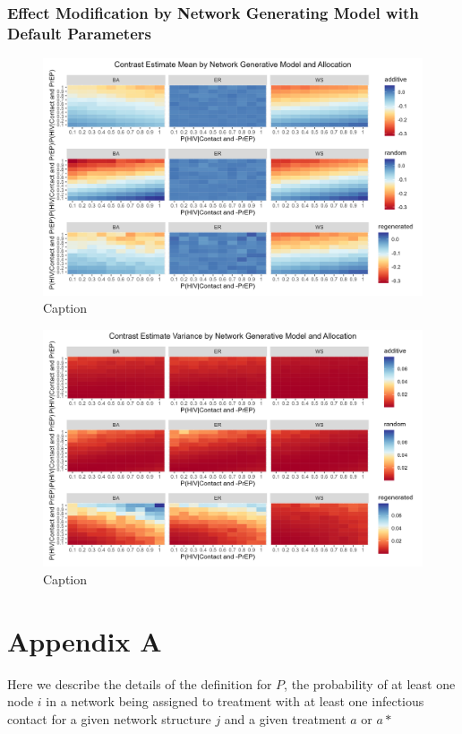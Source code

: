 \documentclass{article}
\theoremstyle{definition}
\begin{document}
\subsubsection{Effect Modification by Network Generating Model with Default Parameters}
\begin{figure}[H]
    \centering
    \includegraphics[scale=0.75]{Figures/Generative Model Mean plots.png}
    \caption{Caption}
    \label{fig:Figure 17}
\end{figure}
\begin{figure}[H]
    \centering
    \includegraphics[scale=0.75]{Figures/Generative Model Variance plots.png}
    \caption{Caption}
    \label{fig:my_label}
\end{figure}
\section{Appendix A}
Here we describe the details of the definition for $P$, the probability of at least one node $i$ in a network being assigned to treatment with at least one infectious contact for a given network structure $j$ and a given treatment $a$ or $a*$
\end{document}
